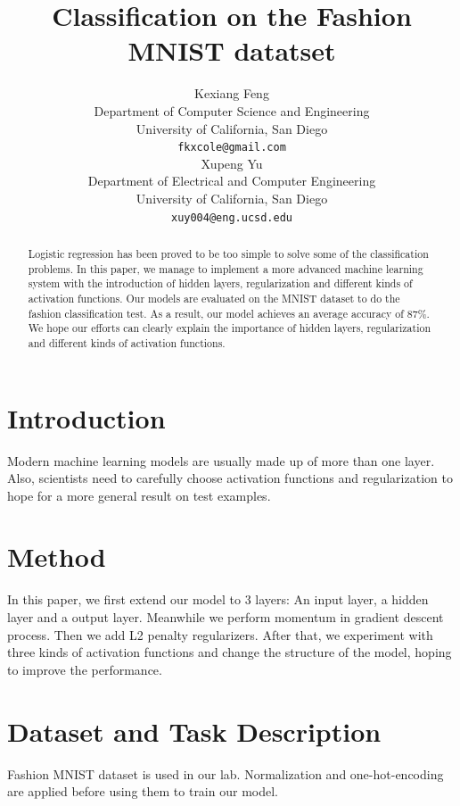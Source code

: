 \documentclass{article} %
\title{Classification on the Fashion MNIST datatset}
\author{
Kexiang Feng \\
Department of Computer Science and Engineering\\
University of California, San Diego\\
\texttt{fkxcole@gmail.com} \\
\And
Xupeng Yu \\
Department of Electrical and Computer Engineering \\
University of California, San Diego \\
\texttt{xuy004@eng.ucsd.edu}
}
\begin{document}
\maketitle

\begin{abstract}
Logistic regression has been proved to be too simple to solve some of the classification problems. In this paper, we manage to implement a more advanced machine learning system with the introduction of hidden layers, regularization and different kinds of activation functions. Our models are evaluated on the MNIST dataset to do the fashion classification test. As a result, our model achieves an average accuracy of $ 87\% $. We hope our efforts can clearly explain the importance of hidden layers, regularization and different kinds of activation functions.	
\end{abstract}
\section{Introduction}
Modern machine learning models are usually made up of more than one layer. Also, scientists need to carefully choose activation functions and regularization to hope for a more general result on test examples.
\section{Method}
In this paper, we first extend our model to 3 layers: An input layer, a hidden layer and a output layer. Meanwhile we perform momentum in gradient descent process. Then we add L2 penalty regularizers. After that, we experiment with three kinds of activation functions and change the structure of the model, hoping to improve the performance.
\section{Dataset and Task Description}
Fashion MNIST dataset is used in our lab. Normalization and one-hot-encoding are applied before using them to train our model.
\end{document}
